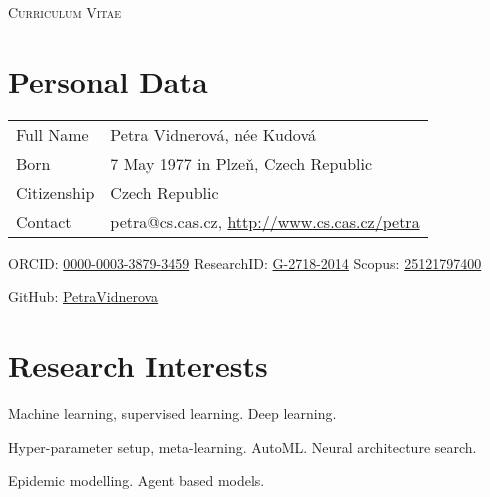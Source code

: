 \documentclass[a4paper, oneside, final]{scrartcl} %
\begin{document}


\noindent
{\fontsize{18}{18}\selectfont\scshape Curriculum Vitae} 



\section{Personal Data}
\begin{tabularx}{0.97\linewidth}{>{\raggedright}p{2cm}X}
Full Name & 	Petra Vidnerov\'a, n\'ee Kudov\'a\\
Born & 7 May 1977 in Plze\v{n}, Czech Republic\\
Citizenship 	& Czech Republic\\
Contact & petra@cs.cas.cz, \href{http://www.cs.cas.cz/petra}{http://www.cs.cas.cz/petra}\\
\end{tabularx}

\centerline{}
\centerline{
  ORCID: \href{https://orcid.org/0000-0003-3879-3459}{0000-0003-3879-3459}
  ResearchID: \href{https://www.webofscience.com/wos/author/record/G-2718-2014}{G-2718-2014}
  Scopus: \href{https://www.scopus.com/authid/detail.url?authorId=25121797400}{25121797400}
  \hfill}
\centerline{
  GitHub: \href{https://www.github.com/PetraVidnerova}{PetraVidnerova}
\hfill
}

\section{Research Interests}

Machine learning, supervised learning. Deep learning.

\noindent
Hyper-parameter setup, meta-learning. AutoML. Neural architecture search.


\noindent
Epidemic modelling. Agent based models.

\end{document}
